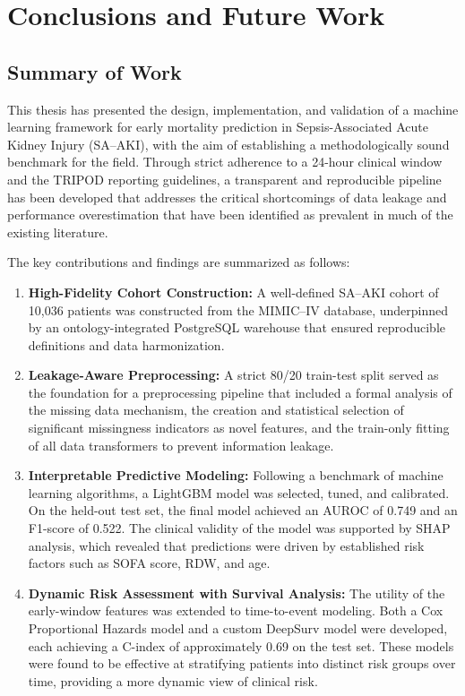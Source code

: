 \chapter{Conclusions and Future Work}\label{chap:conclusion}

\section{Summary of Work}
This thesis has presented the design, implementation, and validation of a machine learning framework for early mortality prediction in Sepsis-Associated Acute Kidney Injury (SA--AKI), with the aim of establishing a methodologically sound benchmark for the field. Through strict adherence to a 24-hour clinical window and the TRIPOD reporting guidelines, a transparent and reproducible pipeline has been developed that addresses the critical shortcomings of data leakage and performance overestimation that have been identified as prevalent in much of the existing literature.

The key contributions and findings are summarized as follows:
\begin{enumerate}
    \item \textbf{High-Fidelity Cohort Construction:} A well-defined SA--AKI cohort of 10,036 patients was constructed from the MIMIC--IV database, underpinned by an ontology-integrated PostgreSQL warehouse that ensured reproducible definitions and data harmonization.

    \item \textbf{Leakage-Aware Preprocessing:} A strict 80/20 train-test split served as the foundation for a preprocessing pipeline that included a formal analysis of the missing data mechanism, the creation and statistical selection of significant missingness indicators as novel features, and the train-only fitting of all data transformers to prevent information leakage.

    \item \textbf{Interpretable Predictive Modeling:} Following a benchmark of machine learning algorithms, a LightGBM model was selected, tuned, and calibrated. On the held-out test set, the final model achieved an AUROC of 0.749 and an F1-score of 0.522. The clinical validity of the model was supported by SHAP analysis, which revealed that predictions were driven by established risk factors such as SOFA score, RDW, and age.

    \item \textbf{Dynamic Risk Assessment with Survival Analysis:} The utility of the early-window features was extended to time-to-event modeling. Both a Cox Proportional Hazards model and a custom DeepSurv model were developed, each achieving a C-index of approximately 0.69 on the test set. These models were found to be effective at stratifying patients into distinct risk groups over time, providing a more dynamic view of clinical risk.
\end{enumerate}

